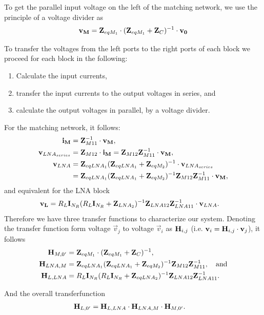 To get the parallel input voltage on the left of the matching network, we use the principle of a voltage divider as
\begin{equation}
\mathbf{v_M} = \mathbf{Z}_{eqM_1}\cdot(\mathbf{Z}_{eqM_1} + \mathbf{Z}_{C})^{-1} \cdot \mathbf{v_0}
\end{equation}

To transfer the voltages from the left ports to the right ports of each block we proceed for each block in the following: 
\begin{enumerate}
\item{Calculate the input currents,}
\item{transfer the input currents to the output voltages in series, and}
\item{calculate the output voltages in parallel, by a voltage divider.}
\end{enumerate}
For the matching network, it follows:
\begin{align}
\mathbf{i_M} &= \mathbf{Z}_{M11}^{-1}\cdot\mathbf{v_M},\\
\mathbf{v}_{LNA_{series}} &= \mathbf{Z}_{M12}\cdot\mathbf{i_M} = \mathbf{Z}_{M12} \mathbf{Z}_{M11}^{-1}\cdot\mathbf{v_M},\\
\mathbf{v}_{LNA} &= \mathbf{Z}_{eqLNA_1}(\mathbf{Z}_{eqLNA_1}+\mathbf{Z}_{eqM_2})^{-1}\cdot\mathbf{v}_{LNA_{series}}\\\nonumber
&=\mathbf{Z}_{eqLNA_1}(\mathbf{Z}_{eqLNA_1}+\mathbf{Z}_{eqM_2})^{-1}\mathbf{Z}_{M12} \mathbf{Z}_{M11}^{-1}\cdot\mathbf{v_M},
\end{align}
and equivalent for the LNA block
\begin{align}
\mathbf{v_{L}}&=R_L\mathbf{I}_{N_R}(R_L\mathbf{I}_{N_R}+\mathbf{Z}_{LNA_2})^{-1}\mathbf{Z}_{LNA12}\mathbf{Z}_{LNA11}^{-1}\cdot\mathbf{v}_{LNA}.
\end{align}
Therefore we have three transfer functions to characterize our system.
Denoting the transfer function form voltage $\vec{v}_j$ to voltage $\vec{v}_i$ as $\mathbf{H}_{i,j}$ (i.e. $\mathbf{v}_i = \mathbf{H}_{i,j} \cdot\mathbf{v}_j$), it follows
\begin{align}
\mathbf{H}_{M,0'} &= \mathbf{Z}_{eqM_1}\cdot(\mathbf{Z}_{eqM_1} + \mathbf{Z}_{C})^{-1}, \\
\mathbf{H}_{LNA,M} &= \mathbf{Z}_{eqLNA_1}(\mathbf{Z}_{eqLNA_1}+\mathbf{Z}_{eqM_2})^{-1}\mathbf{Z}_{M12} \mathbf{Z}_{M11}^{-1},\quad\text{and}\\
\mathbf{H}_{L,LNA} &= R_L\mathbf{I}_{N_R}(R_L\mathbf{I}_{N_R}+\mathbf{Z}_{eqLNA_2})^{-1}\mathbf{Z}_{LNA12}\mathbf{Z}_{LNA11}^{-1}.
\end{align}

And the overall transferfunction
\begin{align}
\mathbf{H}_{L,0'} &= \mathbf{H}_{L,LNA}\cdot\mathbf{H}_{LNA,M}\cdot\mathbf{H}_{M,0'}.
\end{align}



